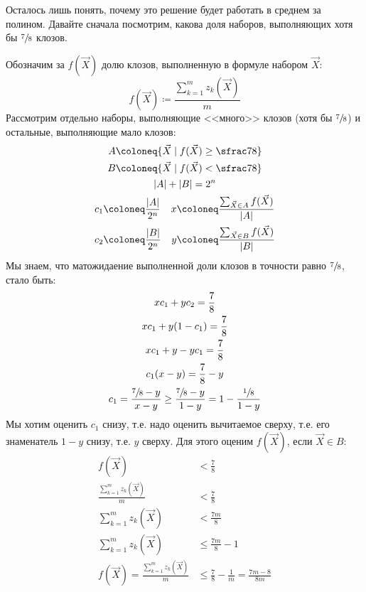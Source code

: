 	Осталось лишь понять, почему это решение будет работать в среднем за полином.
	Давайте сначала посмотрим, какова доля наборов, выполняющих хотя бы $\sfrac 78$ клозов.

	Обозначим за $f(\vec X)$ долю клозов, выполненную в формуле набором $\vec X$:
	\[
		f(\vec X) \coloneq \frac{\sum_{k=1}^m z_k(\vec X)}{m}
	\]
	Рассмотрим отдельно наборы, выполняющие <<много>> клозов (хотя бы $\sfrac 78$) и остальные,
	выполняющие мало клозов:
	\begin{gather*}
		\begin{aligned}
			A &\coloneq \{ \vec X \mid f(\vec X) \ge \sfrac 7 8 \} \\
			B &\coloneq \{ \vec X \mid f(\vec X) < \sfrac 7 8 \}
		\end{aligned} \\
		|A|+|B| = 2^n \\
		\begin{aligned}
			c_1 &\coloneq \frac{|A|}{2^n} &
			x &\coloneq \frac{\sum_{\vec X \in A} f(\vec X)}{|A|} \\
			c_2 &\coloneq \frac{|B|}{2^n} &
			y &\coloneq \frac{\sum_{\vec X \in B} f(\vec X)}{|B|}
		\end{aligned}
	\end{gather*}
	Мы знаем, что матожидаение выполненной доли клозов в точности равно $\sfrac 78$, стало быть:
	\begin{gather*}
		xc_1 + yc_2 = \frac 78\\
		xc_1 + y(1 - c_1) = \frac 78\\
		xc_1 + y - yc_1 = \frac 78\\
		c_1(x-y) = \frac 78 - y\\
		c_1 = \frac{\sfrac 78 - y}{x-y} \ge \frac{\sfrac 78 - y}{1-y} = 1 - \frac{\sfrac18}{1-y}\\
	\end{gather*}
	Мы хотим оценить $c_1$ снизу, т.е. надо оценить вычитаемое сверху, т.е. его знаменатель $1-y$
	снизу, т.е. $y$ сверху.
	Для этого оценим $f(\vec X)$, если $\vec X \in B$:
	\begin{align*}
		f(\vec X) &< \frac 7 8 \\
		\frac{\sum_{k=1}^m z_k(\vec X)}{m} &< \frac 7 8 \\
		\sum_{k=1}^m z_k(\vec X) &< \frac {7m} 8 \\
		\sum_{k=1}^m z_k(\vec X) &\le \frac {7m} 8 - 1 \\
		f(\vec X) = \frac{\sum_{k=1}^m z_k(\vec X)}{m} &\le \frac 7 8 - \frac 1 m = \frac{7m-8}{8m} \\
	\end{align*}
